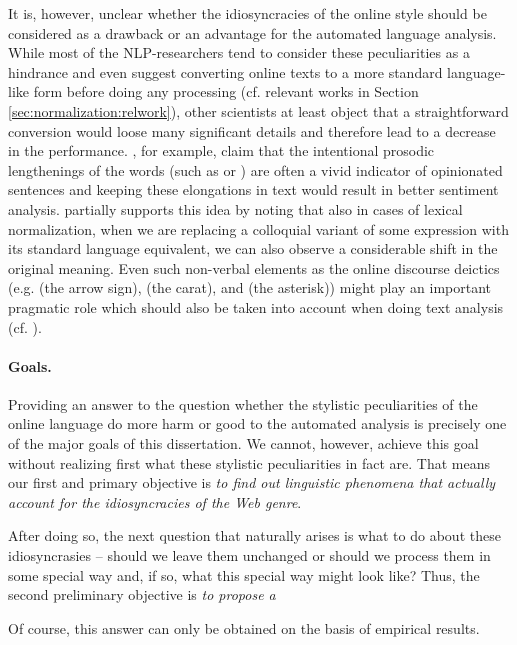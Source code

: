 It is, however, unclear whether the idiosyncracies of the online style should
be considered as a drawback or an advantage for the automated language
analysis.  While most of the NLP-researchers tend to consider these
peculiarities as a hindrance and even suggest converting online texts to a
more standard language-like form before doing any processing (cf. relevant
works in Section \ref{sec:normalization:relwork}), other scientists at least
object that a straightforward conversion would loose many significant details
and therefore lead to a decrease in the performance.
\citet{BrodyDiakopoulos:11}, for example, claim that the intentional prosodic
lengthenings of the words (such as  or
) are often a vivid indicator of opinionated sentences
and keeping these elongations in text would result in better sentiment
analysis.  \citet{Eisenstein:13} partially supports this idea by noting that
also in cases of lexical normalization, when we are replacing a colloquial
variant of some expression with its standard language equivalent, we can also
observe a considerable shift in the original meaning.  Even such non-verbal
elements as the online discourse deictics (e.g. \texample{\upshape <--} (the
arrow sign), \texample{\upshape\^{}} (the carat), and \texample{\upshape *}
(the asterisk)) might play an important pragmatic role which should also be
taken into account when doing text analysis
(cf. \citet{Collister:11,Collister:12}).

\paragraph{Goals.}

Providing an answer to the question whether the stylistic peculiarities of the
online language do more harm or good to the automated analysis is precisely
one of the major goals of this dissertation.  We cannot, however, achieve this
goal without realizing first what these stylistic peculiarities in fact are.
That means our first and primary objective is \emph{to find out linguistic
  phenomena that actually account for the idiosyncracies of the Web genre}.

After doing so, the next question that naturally arises is what to do about
these idiosyncrasies -- should we leave them unchanged or should we process
them in some special way and, if so, what this special way might look like?
Thus, the second preliminary objective is \emph{to propose a }


Of course, this answer can only be obtained on the basis of empirical results.

